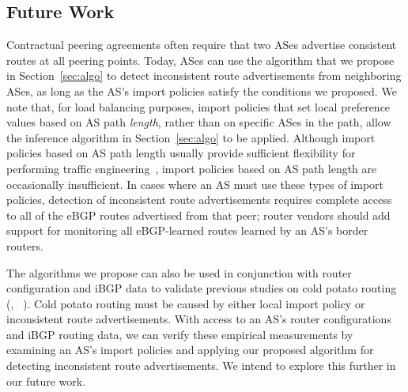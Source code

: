 \subsection{Future Work}
\label{sec:concl}

Contractual peering agreements often require that two ASes advertise
consistent routes at all peering points. 
Today, ASes can use the algorithm that we propose in
Section~\ref{sec:algo} to detect inconsistent route advertisements
from neighboring ASes, as long
as the AS's import policies satisfy the conditions we proposed.  We note
that, for load balancing purposes, import policies that 
set local preference values based on AS path {\em length}, rather than on
specific ASes in the path, allow the inference algorithm in
Section~\ref{sec:algo} to be applied.   Although import policies based
on AS path length usually provide sufficient
flexibility for performing traffic engineering~\cite{Feamster2003e}, import
policies based on AS path length are occasionally insufficient.
In cases where an AS must use these types of import policies,
detection of inconsistent route advertisements requires complete access to
all of the eBGP routes advertised from that peer; router vendors should add
support for monitoring all eBGP-learned routes learned by an AS's border
routers.

The algorithms we propose can also be used in conjunction with
router configuration and iBGP data to validate previous studies on cold
potato routing (\eg, ~\cite{Spring2003}). Cold potato routing must
be caused by either local import policy or inconsistent route
advertisements.  With access to an AS's router configurations and iBGP
routing data, we can verify these empirical measurements by examining an
AS's import policies and applying our proposed algorithm for detecting
inconsistent route advertisements.  We intend to explore this further in
our future work. 


